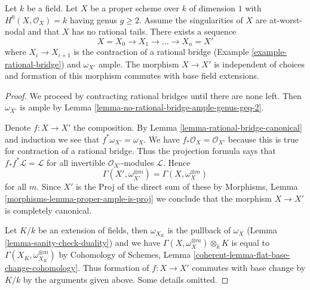 \begin{lemma}
\label{lemma-contracting-rational-bridges}
Let $k$ be a field. Let $X$ be a proper scheme over $k$ of dimension $1$
with $H^0(X, \mathcal{O}_X) = k$ having genus $g \geq 2$.
Assume the singularities of $X$ are at-worst-nodal and that
$X$ has no rational tails. There exists a sequence
$$
X = X_0 \to X_1 \to \ldots \to X_n = X'
$$
where $X_i \to X_{i + 1}$ is the contraction of a rational bridge
(Example \ref{example-rational-bridge}) and $\omega_{X'}$ ample.
The morphism $X \to X'$ is independent of choices and
formation of this morphism commutes with base field extensions.
\end{lemma}

\begin{proof}
We proceed by contracting rational bridges until there are none
left. Then $\omega_{X'}$ is ample by
Lemma \ref{lemma-no-rational-bridge-ample-genus-geq-2}.

\medskip\noindent
Denote $f : X \to X'$ the composition. By
Lemma \ref{lemma-rational-bridge-canonical} and induction we see that
$f^*\omega_{X'} = \omega_X$.
We have $f_*\mathcal{O}_X = \mathcal{O}_{X'}$
because this is true for contraction of a rational bridge.
Thus the projection formula says that
$f_*f^*\mathcal{L} = \mathcal{L}$ for all invertible
$\mathcal{O}_{X'}$-modules $\mathcal{L}$.
Hence
$$
\Gamma(X', \omega_{X'}^{\otimes m}) = \Gamma(X, \omega_X^{\otimes m})
$$
for all $m$. Since $X'$ is the Proj of the direct sum of these
by Morphisms, Lemma \ref{morphisms-lemma-proper-ample-is-proj}
we conclude that the morphism $X \to X'$ is completely canonical.

\medskip\noindent
Let $K/k$ be an extension of fields, then
$\omega_{X_K}$ is the pullback of $\omega_X$
(Lemma \ref{lemma-sanity-check-duality}) and we have
$\Gamma(X, \omega_X^{\otimes m}) \otimes_k K$
is equal to
$\Gamma(X_K, \omega_{X_K}^{\otimes m})$
by
Cohomology of Schemes, Lemma \ref{coherent-lemma-flat-base-change-cohomology}.
Thus formation of $f : X \to X'$ commutes with base change by
$K/k$ by the arguments given above. Some details omitted.
\end{proof}













